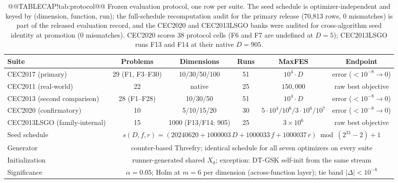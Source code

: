 \documentclass[10pt,a4paper]{article}
\newcommand{\dtgsk}{DT-GSK}
\begin{document}
\begin{table}[H]
\caption{@@TABLECAP!tab:protocol@@ Frozen evaluation protocol, one row per suite. The seed schedule is
optimizer-independent
and keyed by (dimension, function, run); the full-schedule
recomputation audit for the primary release (70{,}813 rows, 0 mismatches) is
part of the
released evaluation record, and the CEC2020 and CEC2013LSGO banks were
audited for cross-algorithm seed identity at promotion (0 mismatches).
CEC2020 scores 38 protocol cells (F6 and F7 are undefined at $D = 5$);
CEC2013LSGO runs F13 and F14 at their native $D = 905$.}\label{tab:protocol}
\setlength{\tabcolsep}{4pt}
\begin{tabular}{lccccc}
\toprule
\textbf{Suite} & \textbf{Problems} & \textbf{Dimensions} & \textbf{Runs} & \textbf{MaxFES} & \textbf{Endpoint} \\
\midrule
CEC2017 (primary) & 29 (F1, F3--F30) & 10/30/50/100 & 51 & $10^{4}\cdot D$ & error ($<10^{-8}\!\to\!0$) \\
CEC2011 (real-world) & 22 & native & 25 & $150{,}000$ & raw best objective \\
CEC2013 (second comparison) & 28 (F1--F28) & 10/30/50 & 51 & $10^{4}\cdot D$ & error ($<10^{-8}\!\to\!0$) \\


CEC2020 (confirmatory) & 10 & 5/10/15/20 & 30 & $5{\cdot}10^{4}/10^{6}/3{\cdot}10^{6}/10^{7}$ & error ($<10^{-8}\!\to\!0$) \\
CEC2013LSGO (family-internal) & 15 & 1000 (F13/F14: 905) & 25 & $3\times10^{6}$ & raw best objective \\
\midrule
Seed schedule & \multicolumn{5}{c}{$s(D,f,r) = (20240620 + 1000003\,D + 1000033\,f + 1000037\,r) \bmod (2^{31}{-}2) + 1$} \\
Generator & \multicolumn{5}{c}{counter-based Threefry; identical schedule for all seven optimizers on every suite} \\
Initialization & \multicolumn{5}{c}{runner-generated shared $X_{0}$; exception: \dtgsk{} self-init from the same stream} \\
Significance & \multicolumn{5}{c}{$\alpha = 0.05$; Holm at $m{=}6$ per dimension (across-function layer); tie band $|\Delta| < 10^{-8}$} \\
\bottomrule
\end{tabular}

\end{table}
\end{document}
